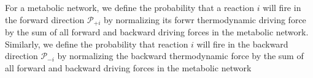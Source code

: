 For a metabolic network, we define the probability that a reaction $i$ will fire in the forward  direction ${\mathcal P_{+i}}$ by normalizing its forwr thermodynamic driving force by the sum of all forward and backward driving forces in the metabolic network. Similarly, we define the probability that reaction $i$ will fire in the backward direction $\mathcal P_{-i}$ by normalizing the backward thermodynamic force by  the sum of all forward and backward driving forces in the metabolic network